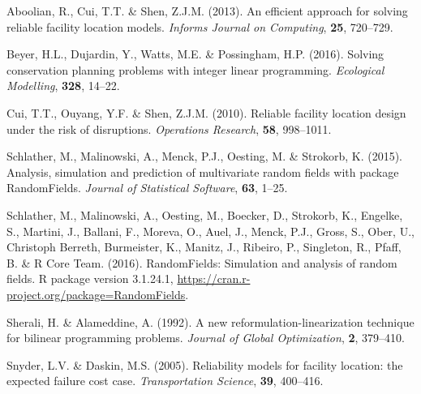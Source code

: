 \documentclass[11pt,]{article}
\begin{document}
\hypertarget{refs}{}
\hypertarget{ref-r15}{}
Aboolian, R., Cui, T.T. \& Shen, Z.J.M. (2013). An efficient approach
for solving reliable facility location models. \emph{Informs Journal on
Computing}, \textbf{25}, 720--729.

\hypertarget{ref-r426}{}
Beyer, H.L., Dujardin, Y., Watts, M.E. \& Possingham, H.P. (2016).
Solving conservation planning problems with integer linear programming.
\emph{Ecological Modelling}, \textbf{328}, 14--22.

\hypertarget{ref-r16}{}
Cui, T.T., Ouyang, Y.F. \& Shen, Z.J.M. (2010). Reliable facility
location design under the risk of disruptions. \emph{Operations
Research}, \textbf{58}, 998--1011.

\hypertarget{ref-r494}{}
Schlather, M., Malinowski, A., Menck, P.J., Oesting, M. \& Strokorb, K.
(2015). Analysis, simulation and prediction of multivariate random
fields with package RandomFields. \emph{Journal of Statistical
Software}, \textbf{63}, 1--25.

\hypertarget{ref-r493}{}
Schlather, M., Malinowski, A., Oesting, M., Boecker, D., Strokorb, K.,
Engelke, S., Martini, J., Ballani, F., Moreva, O., Auel, J., Menck,
P.J., Gross, S., Ober, U., Christoph Berreth, Burmeister, K., Manitz,
J., Ribeiro, P., Singleton, R., Pfaff, B. \& R Core Team. (2016).
RandomFields: Simulation and analysis of random fields. R package
version 3.1.24.1, \url{https://cran.r-project.org/package=RandomFields}.

\hypertarget{ref-r20}{}
Sherali, H. \& Alameddine, A. (1992). A new reformulation-linearization
technique for bilinear programming problems. \emph{Journal of Global
Optimization}, \textbf{2}, 379--410.

\hypertarget{ref-r18}{}
Snyder, L.V. \& Daskin, M.S. (2005). Reliability models for facility
location: the expected failure cost case. \emph{Transportation Science},
\textbf{39}, 400--416.
\end{document}
